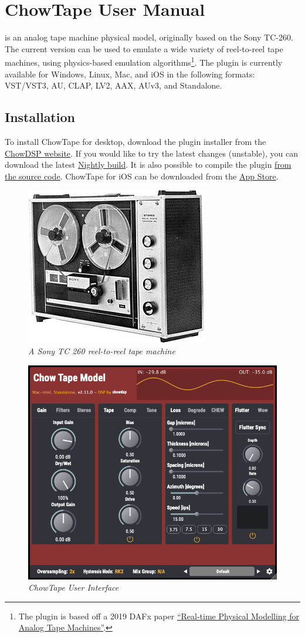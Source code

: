 \documentclass[landscape,twocolumn,a5paper]{manual}
\begin{document}
\section{ChowTape User Manual}

\noindent
{} is an analog tape machine physical model,
originally based on the Sony TC-260. The current version
can be used to emulate a wide variety of reel-to-reel tape
machines, using physics-based emulation algorithms\footnote{The
plugin is based off a 2019 DAFx paper \href{http://dafx2019.bcu.ac.uk/papers/DAFx2019_paper_3.pdf}{``Real-time Physical Modelling for Analog Tape Machines''}.}.
The plugin is currently available for Windows, Linux, Mac, and iOS
in the following formats: VST/VST3, AU, CLAP, LV2,
AAX, AUv3, and Standalone.

\subsection{Installation}
To install ChowTape for desktop, download the plugin installer
from the \href{https://chowdsp.com/products.html#tape}{ChowDSP website}.
If you would like to try the latest changes (unstable), you can
download the latest \href{https://chowdsp.com/nightly.html}{Nightly build}.
It is also possible to compile the plugin
\href{https://github.com/jatinchowdhury18/AnalogTapeModel/blob/master/BUILDING.md}{from the source code}.
ChowTape for iOS can be downloaded from the
\href{https://apps.apple.com/us/app/chowtapemodel/id1557806564}{App Store}.

\begin{figure}[ht]
    \center
    \includegraphics[width=0.45\columnwidth]{sony_tc-260.jpg}
    \caption{\label{TapeMachine}{\it A Sony TC 260 reel-to-reel tape machine}}
\end{figure}

\begin{figure}[ht]
    \center
    \includegraphics[width=0.55\columnwidth]{../Plugin/Screenshots/full_gui.png}
    \caption{\label{full_gui}{\it ChowTape User Interface}}
\end{figure}
\end{document}
